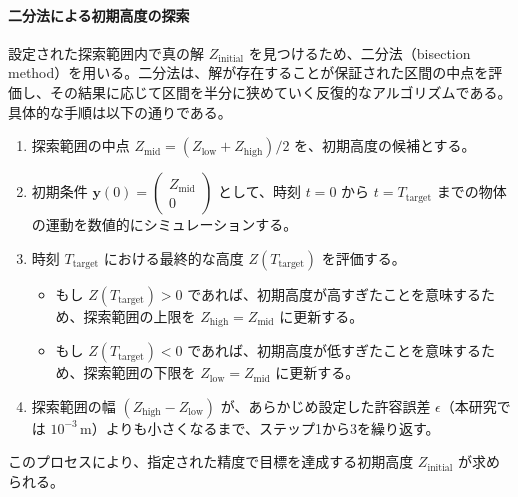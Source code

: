 \documentclass[a4paper,12pt]{article}
\begin{document}
\paragraph{二分法による初期高度の探索}
\label{par:bisection}
設定された探索範囲内で真の解 $Z_{\mathrm{initial}}$ を見つけるため、二分法（bisection method）を用いる。二分法は、解が存在することが保証された区間の中点を評価し、その結果に応じて区間を半分に狭めていく反復的なアルゴリズムである。具体的な手順は以下の通りである。
\begin{enumerate}
    \item 探索範囲の中点 $Z_{\mathrm{mid}} = (Z_{\mathrm{low}} + Z_{\mathrm{high}}) / 2$ を、初期高度の候補とする。
    \item 初期条件 $\bm{y}(0) = \begin{pmatrix} Z_{\mathrm{mid}} \\ 0 \end{pmatrix}$ として、時刻 $t=0$ から $t=T_{\mathrm{target}}$ までの物体の運動を数値的にシミュレーションする。
    \item 時刻 $T_{\mathrm{target}}$ における最終的な高度 $Z(T_{\mathrm{target}})$ を評価する。
    \begin{itemize}
        \item もし $Z(T_{\mathrm{target}}) > 0$ であれば、初期高度が高すぎたことを意味するため、探索範囲の上限を $Z_{\mathrm{high}} = Z_{\mathrm{mid}}$ に更新する。
        \item もし $Z(T_{\mathrm{target}}) < 0$ であれば、初期高度が低すぎたことを意味するため、探索範囲の下限を $Z_{\mathrm{low}} = Z_{\mathrm{mid}}$ に更新する。
    \end{itemize}
    \item 探索範囲の幅 $(Z_{\mathrm{high}} - Z_{\mathrm{low}})$ が、あらかじめ設定した許容誤差 $\epsilon$（本研究では $10^{-3} \, \mathrm{m}$）よりも小さくなるまで、ステップ1から3を繰り返す。
\end{enumerate}
このプロセスにより、指定された精度で目標を達成する初期高度 $Z_{\mathrm{initial}}$ が求められる。
\end{document}
